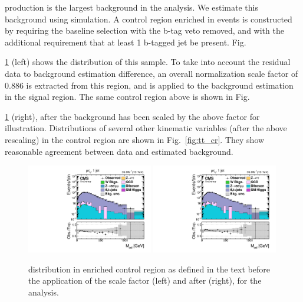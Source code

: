 \ttb production is the largest background in the \Hmue analysis. We estimate this background using simulation. A control region enriched in \ttb events is constructed by requiring the baseline selection with the b-tag veto removed, and with the additional requirement that at least 1 b-tagged jet be present. Fig.~{\ref{fig:tt_cr_nosf} (left) shows the \mcol distribution of this sample. To take into account the residual data to background estimation difference, an overall normalization scale factor of 0.886 is extracted from this region, and is applied to the background estimation in the signal region. The same control region above is shown in Fig.~{\ref{fig:tt_cr_nosf} (right), after the background has been scaled by the above factor for illustration. Distributions of several other kinematic variables (after the above rescaling) in the \ttb control region are shown in Fig.~\ref{fig:tt_cr}. They show reasonable agreement between data and estimated background.

\begin{figure}[htpb]
  \begin{center}
    \captionsetup{width=.95\textwidth,justification=centering}
    \includegraphics[width=0.49\textwidth]{plots_and_figures/chapter6/tt_cr_hm/ttbarNoSF.pdf}
    \includegraphics[width=0.49\textwidth]{plots_and_figures/chapter6/tt_cr_hm/ttbarSF.pdf}
  \caption{\mcol distribution in \ttb enriched control region as defined in the text before the application of the scale factor (left) and after (right), for the \Hmue analysis.}
  \end{center}
  \label{fig:tt_cr_nosf}
\end{figure}

}}
